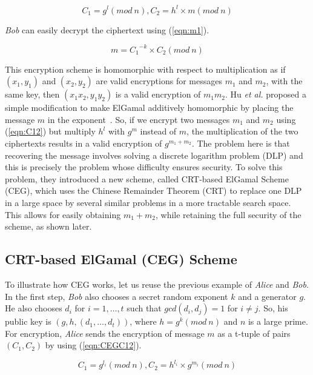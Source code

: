 \documentclass[conference]{IEEEtran}
\begin{document}
\begin{equation}
C_1 = g^l (mod \: n), C_2 = h^l \times m (mod \: n)
\label{eqn:C12}
\end{equation}





\noindent \textit{Bob} can easily decrypt the ciphertext using (\ref{eqn:m1}).

\begin{equation}
m = {C_1}^{-k} \times C_2 (mod \: n)
\label{eqn:m1}
\end{equation}

\noindent This encryption scheme is homomorphic with respect to multiplication as if $(x_1,y_1)$ and $(x_2,y_2)$ are valid encryptions for messages $m_1$ and $m_2$, with the same key, then $(x_1x_2,y_1y_2)$ is a valid encryption of $m_1m_2$. Hu \textit{et al.} proposed a simple modification to make ElGamal additively homomorphic by placing the message $m$ in the exponent{\color{blue}~\cite{homoCRT}}. So, if we encrypt two messages $m_1$ and $m_2$ using (\ref{eqn:C12}) but multiply $h^l$ with $g^m$ instead of $m$, the multiplication of the two ciphertexts results in a valid encryption of $g^{m_1+m_2}$. The problem here is that recovering the message involves solving a discrete logarithm problem (DLP) and this is precisely the problem whose difficulty ensures security. To solve this problem, they introduced a new scheme, called CRT-based ElGamal Scheme (CEG), which uses the Chinese Remainder Theorem (CRT) to replace one DLP in a large space by several similar problems in a more tractable search space. This allows for easily obtaining $m_1 + m_2$, while retaining the full security of the scheme, as shown later.
 
\subsection{CRT-based ElGamal (CEG) Scheme}
To illustrate how CEG works, let us reuse the previous example of \textit{Alice} and \textit{Bob}. In the first step, \textit{Bob} also chooses a secret random exponent $k$ and a generator $g$. He also chooses $d_i$ for $i = 1,\dots,t$ such that $gcd(d_i,d_j)=1$ for $i \neq j$. So, his public key is $(g,h,(d_1,\dots,d_t))$, where ${h = g^k (mod \: n)}$ and $n$ is a large prime. For encryption, \textit{Alice} sends the encryption of message $m$ as a t-tuple of pairs $(C_1,C_2)$ by using (\ref{eqn:CEGC12}).

\begin{equation}
C_1 = g^{l_i} (mod \: n), C_2 = h^{l_i} \times g^{m_i} (mod \: n) 
\label{eqn:CEGC12}
\end{equation}
\end{document}
